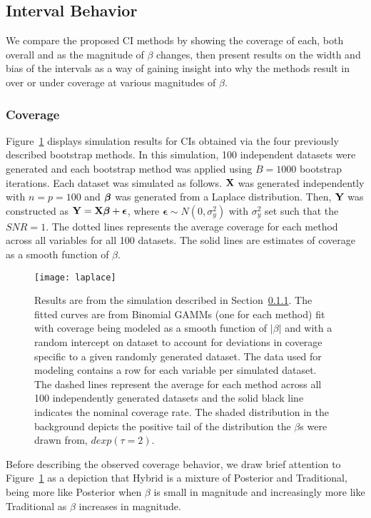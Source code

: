 \subsection{Interval Behavior}

We compare the proposed CI methods by showing the coverage of each, both overall and as the magnitude of $\beta$ changes, then present results on the width and bias of the intervals as a way of gaining insight into why the methods result in over or under coverage at various magnitudes of $\beta$.

\subsubsection{Coverage}\label{Sec:Coverage}

Figure~\ref{Fig:laplace} displays simulation results for CIs obtained via the four previously described bootstrap methods. In this simulation, 100 independent datasets were generated and each bootstrap method was applied using $B = 1000$ bootstrap iterations. Each dataset was simulated as follows. $\mathbf{X}$ was generated independently with $n = p = 100$ and $\boldsymbol{\beta}$ was generated from a Laplace distribution. Then, $\mathbf{Y}$ was constructed as $\mathbf{Y} = \mathbf{X}\boldsymbol{\beta} + \boldsymbol{\epsilon}$, where $\boldsymbol{\epsilon} \sim N(0, \sigma^2_y)$ with $\sigma^2_y$ set such that the $SNR = 1$. The dotted lines represents the average coverage for each method across all variables for all 100 datasets. The solid lines are estimates of coverage as a smooth function of $\beta$.

\begin{figure}[hbtp]
  \texttt{[image: laplace]}
  \caption{\label{Fig:laplace} Results are from the simulation described in Section~\ref{Sec:Coverage}. The fitted curves are from Binomial GAMMs (one for each method) fit with coverage being modeled as a smooth function of $|\beta|$ and with a random intercept on dataset to account for deviations in coverage specific to a given randomly generated dataset. The data used for modeling contains a row for each variable per simulated dataset. The dashed lines represent the average for each method across all 100 independently generated datasets and the solid black line indicates the nominal coverage rate. The shaded distribution in the background depicts the positive tail of the distribution the $\beta$s were drawn from, $dexp(\tau = 2)$.}
\end{figure}

Before describing the observed coverage behavior, we draw brief attention to Figure~\ref{Fig:laplace} as a depiction that Hybrid is a mixture of Posterior and Traditional, being more like Posterior when $\beta$ is small in magnitude and increasingly more like Traditional as $\beta$ increases in magnitude.

